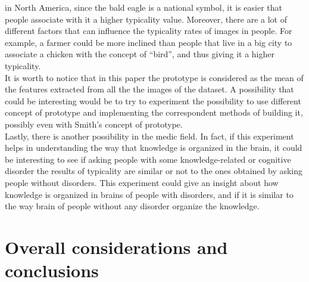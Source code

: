 \documentclass[conference]{IEEEtran}
\begin{document}
			in North America, since the bald eagle is a national symbol, it is easier that people associate with it a higher typicality value. Moreover, there are a lot of different factors that can influence 
			the typicality rates of images in people. For example, a farmer could be more inclined than people that live in a big city to associate a chicken with the concept of ``bird'', and thus giving 
			it a higher typicality.\\
			It is worth to notice that in this paper the prototype is considered as the mean of the features extracted from all the the images of the dataset. A possibility that could be interesting would be 
			to try to experiment the possibility to use different concept of prototype and implementing the correspondent methods of building it, possibly even with Smith's concept of prototype.\\
			Lastly, there is another possibility in the medic field. In fact, if this experiment helps in understanding the way that knowledge is organized in the brain, it could be interesting to see if 
			asking people with some knowledge-related or cognitive disorder the results of typicality are similar or not to the ones obtained by asking people without disorders. This experiment could give 
			an insight about how knowledge is organized in brains of people with disorders, and if it is similar to the way brain of people without any disorder organize the knowledge. 
	
	\section{Overall considerations and conclusions}
	
\end{document}
